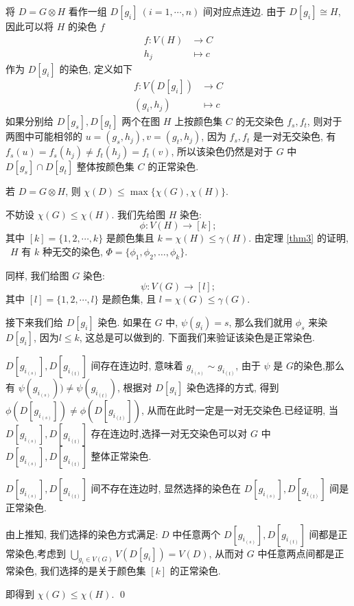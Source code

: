 \documentclass[12pt,a4paper]{article}%
\begin{document}
将 $D = G \otimes H$ 看作一组 $D[g_i] \ (i = 1,\cdots,n)$ 间对应点连边.
由于 $D[g_i] \cong H$, 因此可以将 $H$ 的染色 $f$
\begin{equation*}
    \begin{aligned}
        f:V(H) &\rightarrow C\\
        h_j &\mapsto c
    \end{aligned}
    \label{map1}
\end{equation*}
作为 $D[g_i]$ 的染色, 定义如下
\begin{equation*}
    \begin{aligned}
        f:V(D[g_i]) &\rightarrow C\\
        (g_i,h_j) &\mapsto c
    \end{aligned}
    \label{map2}
\end{equation*}
如果分别给 $D[g_s],D[g_t]$ 两个在图 $H$ 上按颜色集 $C$ 的无交染色 $f_s,f_t$, 则对于两图中可能相邻的 $u = (g_s,h_j), v = (g_t,h_j)$, 因为 $f_s,f_t$ 是一对无交染色, 有 $f_s(u) = f_s(h_j) \neq f_t(h_j) = f_t(v)$, 所以该染色仍然是对于 $G$ 中 $D[g_s] \cap D[g_t]$ 整体按颜色集 $C$ 的正常染色.


\begin{thm}\label{main thm}
    若 $D = G \otimes H$,  则 $\chi (D) \leq \max \{\chi (G), \chi (H)\}$.
\end{thm}
\begin{pf}\label{mainthm}
  不妨设 $\chi(G)\leq \chi(H)$. 我们先给图 $H$ 染色:
  $$\phi: V(H)\rightarrow [k];$$
  其中 $[k]=\{1,2,\cdots, k\}$ 是颜色集且 $k=\chi(H)\leq \gamma(H)$. 由定理 \ref{thm3} 的证明, ~$H$ 有 $k$ 种无交的染色, $\Phi = \{  \phi_1,\phi_2,\ldots,\phi_k \}$. 
  
  同样, 我们给图 $G$ 染色:
  $$\psi: V(G)\rightarrow [l];$$
  其中 $[l]=\{1,2,\cdots, l\}$ 是颜色集, 且 $l = \chi(G) \leq \gamma(G)$.
  

  接下来我们给 $D[g_i]$ 染色. 如果在 $G$ 中, $\psi(g_i)=s$, 那么我们就用 $\phi_s$ 来染 $D[g_i]$,  因为$l \leq k$, 这总是可以做到的. 下面我们来验证该染色是正常染色.

   $D[g_{i_{(s)}}],D[g_{i_{(t)}}]$ 间存在连边时, 意味着 $g_{i_{(s)}} \sim g_{i_{(t)}}$, 由于 $\psi$ 是 $G$的染色,那么有 $\psi(g_{i_{(s)}})) \neq \psi(g_{i_{(t)}})$, 根据对 $D[g_i]$ 染色选择的方式, 得到$\phi(D[g_{i_{(s)}}]) \neq \phi(D[g_{i_{(t)}}])$, 从而在此时一定是一对无交染色.已经证明, 当 $D[g_{i_{(s)}}],D[g_{i_{(t)}}]$ 存在连边时,选择一对无交染色可以对 $G$ 中 $D[g_{i_{(s)}}],D[g_{i_{(t)}}]$ 整体正常染色.

  $D[g_{i_{(s)}}],D[g_{i_{(t)}}]$ 间不存在连边时, 显然选择的染色在 $D[g_{i_{(s)}}],D[g_{i_{(t)}}]$ 间是正常染色.

  由上推知, 我们选择的染色方式满足: $D$ 中任意两个 $D[g_{i_{(s)}}],D[g_{i_{(t)}}]$ 间都是正常染色,考虑到 $\underset {g_i \in V(G)}{\bigcup}V (D[g_i]) = V(D)$, 从而对 $G$ 中任意两点间都是正常染色, 我们选择的是关于颜色集 $[k]$ 的正常染色.

  即得到 $\chi(G) \leq \chi (H)$. \qed  
\end{pf}
\end{document}
